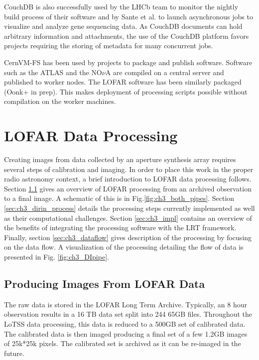 CouchDB is also successfully used by the LHCb team to monitor the nightly build process of their software\cite{clemencic2014new} and by Sante et al.\cite{sante2010development} to launch asynchronous jobs to visualize and analyze gene sequencing data. As CouchDB documents can hold arbitrary information and attachments, the use of the CouchDB platform favors projects requiring the storing of metadata for many concurrent jobs. 

CernVM-FS\cite{cvmfs2008} has been used by projects to package and publish software. Software such as the ATLAS \cite{cvmfsatlas} and the NO$\nu$A \cite{cvmfsnova} are compiled on a central server and published to worker nodes. The LOFAR software has been similarly packaged (Oonk+ in prep). This makes deployment of processing scripts possible without compilation on the worker machines. 

\section{LOFAR Data Processing}\label{sec:ch3_lofar_red}

Creating images from data collected by an aperture synthesis array\cite{aperturesynth} requires several steps of calibration and imaging. In order to place this work in the proper radio astronomy context, a brief introduction to LOFAR data processing follows. Section \ref{sec:ch3_image} gives an overview of LOFAR processing from an archived observation to a final image. A schematic of this is in Fig.\ref{fig:ch3_both_pipes}. Section \ref{sec:ch3_dirin_process} details the processing steps currently implemented as well as their computational challenges. Section \ref{sec:ch3_impl} contains an overview of the benefits of integrating the processing software with the LRT framework.  Finally, section \ref{sec:ch3_dataflow} gives description of the processing by focusing on the data flow. A visualization of the processing detailing the flow of data is presented in Fig. \ref{fig:ch3_DIpipe}.


\subsection{Producing Images From LOFAR Data}\label{sec:ch3_image}

The raw data is stored in the LOFAR Long Term Archive. Typically, an 8 hour observation results in a 16 TB data set split into 244 65GB files. Throughout the LoTSS data processing, this data is reduced to a 500GB set of calibrated data. The calibrated data is then imaged producing a final set of a few 1.2GB images of 25k*25k pixels. The calibrated set is archived as it can be re-imaged in the future. 

